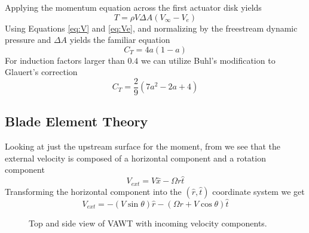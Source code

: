 \documentclass{article}
\begin{document}
Applying the momentum equation across the first actuator disk yields
\begin{equation}
    T = \rho V \Delta A (V_\infty - V_e)
\end{equation}
Using Equations \eqref{eq:V} and \eqref{eq:Ve}, and normalizing by the freestream dynamic pressure and $\Delta A$ yields the familiar equation
\begin{equation}
    C_T = 4a(1-a)
    \label{eq:ctmom}
\end{equation}
For induction factors larger than $0.4$ we can utilize Buhl's modification to Glauert's correction
\begin{equation}
    C_T = \frac{2}{9} (7a^2 - 2a + 4)
    \label{eq:ctglauert}
\end{equation}


\subsection{Blade Element Theory}

Looking at just the upstream surface for the moment, from  we see that the external velocity is composed of a horizontal component and a rotation component
\begin{equation}
    V_{ext} = V\hat{x} - \Omega r \hat{t}
\end{equation}
Transforming the horizontal component into the $(\hat{r}, \hat{t})$ coordinate system we get
\begin{equation}
    V_{ext} = -(V\sin\theta)\hat{r} - (\Omega r + V\cos\theta) \hat{t}
\end{equation}

\begin{figure}[htbp]
\centering
 \qquad
 \caption{Top and side view of VAWT with incoming velocity components.}
\end{figure}
\end{document}
